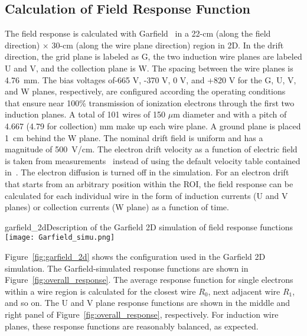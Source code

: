 \subsection{Calculation of Field Response Function}
\label{sec:decon-frf-calc}

The field response is calculated with Garfield~\cite{garfield} in a 22-cm (along the 
field direction) $\times$ 30-cm (along the wire plane direction) region in 2D.  
In the drift direction, the grid plane is labeled as G, the two induction %
wire 
planes are labeled U and V, and the collection plane is W.  The spacing between the wire 
planes is 4.76~mm. The bias voltages of-665 V, -370 V, 0 V, and +820 V for the G, U, V, and 
W planes, respectively, are configured according the operating conditions that ensure near 100\%
    transmission of ionization electrons through the first two induction planes.  
    A total of 101 wires of 150 $\mu$m diameter and with a pitch of 4.667 (4.79 for collection) mm make up each wire plane. 
    A ground plane is placed 1~cm behind the W plane.  The nominal drift
    field is uniform and has a magnitude of 500~V/cm. The electron drift velocity as a function of
    electric field is taken from measurements~\cite{Li:2015rqa,lar_property}
    instead of using the default velocity table contained in~\cite{garfield}. %
    The electron diffusion is turned off in the simulation. 
    For an 
    electron drift that starts from an arbitrary position within the ROI, the field response can
    be calculated for each individual wire in the form of induction currents 
    (U and V planes) or collection currents (W plane) as a function of time.

\begin{cdrfigure}{garfield_2d}{Description of the Garfield 2D simulation of field response functions}
  \texttt{[image: Garfield\_simu.png]}
\end{cdrfigure}
    
    
    Figure~\ref{fig:garfield_2d} shows the configuration used in the Garfield 2D simulation.
The Garfield-simulated response functions are shown in Figure~\ref{fig:overall_response}.
 The average response function for single electrons within a wire region 
is calculated for the closest wire $R_0$, next adjacent wire $R_1$, and so on. The U and 
V plane response functions are shown in the middle and right panel of 
Figure~\ref{fig:overall_response}, respectively.  For induction wire planes, these response 
functions are reasonably balanced, as expected.




